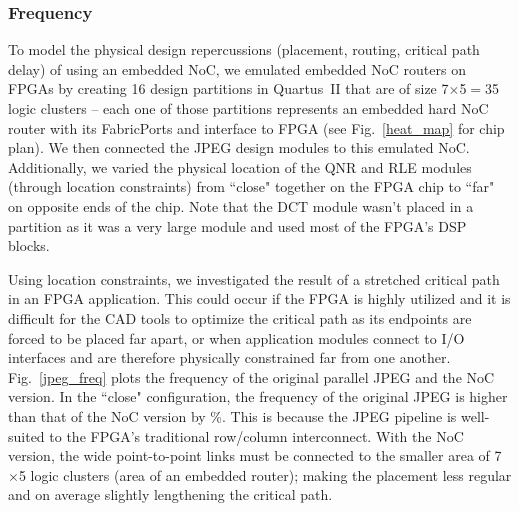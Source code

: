 \subsubsection{Frequency}

To model the physical design repercussions (placement, routing, critical path delay) of using an embedded NoC, we emulated embedded NoC routers on FPGAs by creating 16 design partitions in Quartus~II that are of size 7$\times$5$=$35 logic clusters -- each one of those partitions represents an embedded hard NoC router with its FabricPorts and interface to FPGA (see Fig.~\ref{heat_map} for chip plan).
We then connected the JPEG design modules to this emulated NoC.
Additionally, we varied the physical location of the QNR and RLE modules (through location constraints) from ``close" together on the FPGA chip to ``far" on opposite ends of the chip.
Note that the DCT module wasn't placed in a partition as it was a very large module and used most of the FPGA's DSP blocks.

%
%

Using location constraints, we investigated the result of a stretched critical path in an FPGA application.
This could occur if the FPGA is highly utilized and it is difficult for the CAD tools to optimize the critical path as its endpoints are forced to be placed far apart, or when application modules connect to I/O interfaces and are therefore physically constrained far from one another.
Fig.~\ref{jpeg_freq} plots the frequency of the original parallel JPEG and the NoC version.
In the ``close" configuration, the  frequency of the original JPEG is higher than that of the NoC version by \%. 
This is because the JPEG pipeline is well-suited to the FPGA's traditional row/column interconnect.
With the NoC version, the wide point-to-point links must be connected to the smaller area of 7$\times$5 logic clusters (area of an embedded router); making the placement less regular and on average slightly lengthening the critical path.

%
%

